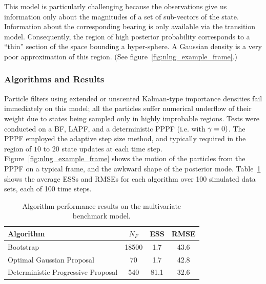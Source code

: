 \documentclass{article}
\begin{document}
This model is particularly challenging because the observations give us information only about the magnitudes of a set of sub-vectors of the state. Information about the corresponding bearing is only available via the transition model. Consequently, the region of high posterior probability corresponds to a ``thin'' section of the space bounding a hyper-sphere. A Gaussian density is a very poor approximation of this region. (See figure~\ref{fig:nlng_example_frame}.)

\subsubsection{Algorithms and Results}

Particle filters using extended or unscented Kalman-type importance densities fail immediately on this model; all the particles suffer numerical underflow of their weight due to states being sampled only in highly improbable regions. Tests were conducted on a BF, LAPF, and a deterministic PPPF (i.e. with $\gamma=0)$. The PPPF employed the adaptive step size method, and typically required in the region of $10$ to $20$ state updates at each time step. Figure~\ref{fig:nlng_example_frame} shows the motion of the particles from the PPPF on a typical frame, and the awkward shape of the posterior mode. Table~\ref{tab:nlng_results} shows the average ESSs and RMSEs for each algorithm over 100 simulated data sets, each of 100 time steps.
%
\begin{table}
\centering
\begin{tabular}{l||c|c|c}
Algorithm                                & $N_F$ & ESS  & RMSE \\
\hline
Bootstrap                                & 18500 &  1.7 & 43.6 \\
Optimal Gaussian Proposal                &    70 &  1.7 & 42.8 \\
Deterministic Progressive Proposal         &   540 & 81.1 & 32.6 \\
\end{tabular}
\caption{Algorithm performance results on the multivariate benchmark model.}
\label{tab:nlng_results}
\end{table}
%
\end{document}
